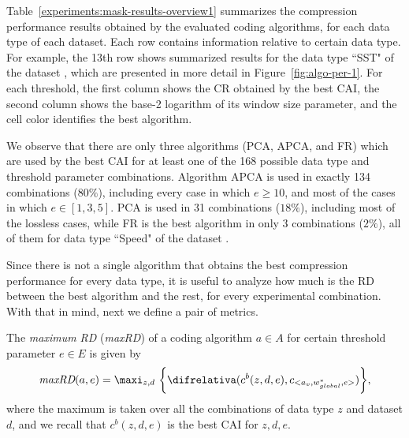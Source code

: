 \clearpage
{}
\clearpage


Table~\ref{experiments:mask-results-overview1} summarizes the compression performance results obtained by the evaluated coding algorithms, for each data type of each dataset. Each row contains information relative to certain data type. For example, the 13th row shows summarized results for the data type ``SST" of the dataset \datasetelnino, which are presented in more detail in Figure~\ref{fig:algo-per-1}. For each threshold, the first column shows the CR obtained by the best CAI, the second column shows the base-2 logarithm of its window size parameter, and the cell color identifies the best algorithm.
\vspace{+5pt}





We observe that there are only three algorithms (PCA, APCA, and FR) which are used by the best CAI for at least one of the 168 possible data type and threshold parameter combinations. Algorithm APCA is used in exactly 134 combinations ($80\%$), including every case in which $e \geq 10$, and most of the cases in which $e \in [1, 3, 5]$. PCA is used in 31 combinations ($18\%$), including most of the lossless cases, while FR is the best algorithm in only 3 combinations ($2\%$), all of them for data type ``Speed" of the dataset \datasetwind.


Since there is not a single algorithm that obtains the best compression performance for every data type, it is useful to analyze how much is the RD between the best algorithm and the rest, for every experimental combination. With that in mind, next we define a pair of metrics.


\clearpage


\newcommand{\maxRD}{maxRD}
\newcommand{\maxRDit}{\textit{maxRD}}
\begin{defcion}
\label{eq:maxRD}
The \textit{maximum RD} (\maxRDit) of a coding algorithm $a\in A$ for certain threshold parameter $e\in E$ is given by
\vspace{-4pt}
\begin{equation}
\maxRDit(a, e) = \maxi_{z, d} \ \biggl\{ \difrelativa(c^{b}(z,d,e), c_{<a_v, w_{global}^{*}, e>}) \biggr\},
\end{equation}
where the maximum is taken over all the combinations of data type $z$ and dataset $d$, and we recall that $c^{b}(z,d,e)$ is the best CAI for $z, d, e$.
\end{defcion}



